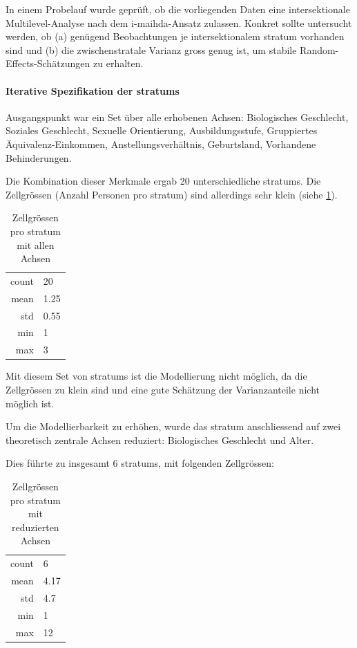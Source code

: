In einem Probelauf wurde geprüft, ob die vorliegenden Daten eine intersektionale Multilevel-Analyse nach dem \gls{i-maihda}-Ansatz zulassen. Konkret sollte untersucht werden, ob (a) genügend Beobachtungen je intersektionalem \gls{stratum} vorhanden sind und (b) die zwischenstratale Varianz gross genug ist, um stabile Random-Effects-Schätzungen zu erhalten.

\paragraph{Iterative Spezifikation der \glspl{stratum}}
Ausgangspunkt war ein Set über alle erhobenen Achsen: Biologisches Geschlecht, Soziales Geschlecht, Sexuelle Orientierung, Ausbildungsstufe, Gruppiertes Äquivalenz-Einkommen, Anstellungsverhältnis, Geburtsland, Vorhandene Behinderungen.

Die Kombination dieser Merkmale ergab 20 unterschiedliche \glspl{stratum}. Die Zellgrössen (Anzahl Personen pro \gls{stratum}) sind allerdings sehr klein (siehe \cref{tab:zellgroessen_alle_achsen}).

\begin{table}[h]
    \centering
    \begin{tabular}{rl}
        count & 20 \\
        mean & 1.25 \\
        std & 0.55 \\
        min & 1 \\
        max & 3 \\
    \end{tabular}
    \caption{Zellgrössen pro \gls{stratum} mit allen Achsen}
    \label{tab:zellgroessen_alle_achsen}
\end{table}

Mit diesem Set von \glspl{stratum} ist die Modellierung nicht möglich, da die Zellgrössen zu klein sind und eine gute Schätzung der Varianzanteile nicht möglich ist.

Um die Modellierbarkeit zu erhöhen, wurde das \gls{stratum} anschliessend auf zwei theoretisch zentrale Achsen reduziert: Biologisches Geschlecht und Alter.

Dies führte zu insgesamt $6$ \glspl{stratum}, mit folgenden Zellgrössen:

\begin{table}[h]
    \centering
    \begin{tabular}{rl}
        count & 6 \\
        mean & 4.17 \\
        std & 4.7 \\
        min & 1 \\
        max & 12 \\
    \end{tabular}
    \caption{Zellgrössen pro \gls{stratum} mit reduzierten Achsen}
    \label{tab:zellgroessen_reduzierte_achsen}
\end{table}

